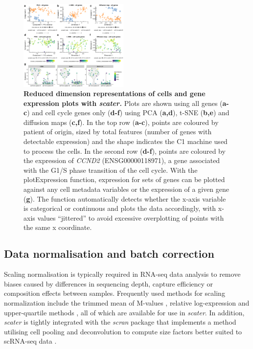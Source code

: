 \documentclass{bioinfo}
\begin{document}
\begin{figure}[!tpb]%
\centerline{\includegraphics[width=0.48\textwidth]{figures/figure4.pdf}}
\caption{\textbf{Reduced dimension representations of cells and gene expression plots with \emph{scater.}} Plots are shown using all genes (\textbf{a-c}) and cell cycle genes only (\textbf{d-f}) using PCA (\textbf{a,d}), t-SNE (\textbf{b,e}) and diffusion maps (\textbf{c,f}). In the top row (\textbf{a-c}), points are coloured by patient of origin, sized by total features (number of genes with detectable expression) and the shape indicates the C1 machine used to process the cells. In the second row (\textbf{d-f}), points are coloured by the expression of \emph{CCND2} (ENSG00000118971), a gene associated with the G1/S phase transition of the cell cycle. With the plotExpression function, expression for sets of genes can be plotted against any cell metadata variables or the expression of a given gene (\textbf{g}). The function automatically detects whether the x-axis variable is categorical or continuous and plots the data accordingly, with x-axis values ``jittered'' to avoid excessive overplotting of points with the same x coordinate.}\label{fig:04}
\end{figure}


\subsection{Data normalisation and batch correction} \label{data-normalisation-and-batch-correction}

Scaling normalisation is typically required in RNA-seq data analysis to remove biases caused by differences in sequencing depth, capture efficiency or composition effects between samples. Frequently used methods for scaling normalization include the trimmed mean of M-values \citep{Robinson2010-dy}, relative log-expression \citep{Anders2010-kv} and upper-quartile methods \citep{Bullard2010-ui}, all of which are available for use in \emph{scater}. In addition, \emph{scater} is tightly integrated with the \emph{scran} package that implements a method utilising cell pooling and deconvolution to compute size factors better suited to scRNA-seq data \citep{Lun2016-sk}.
\end{document}
